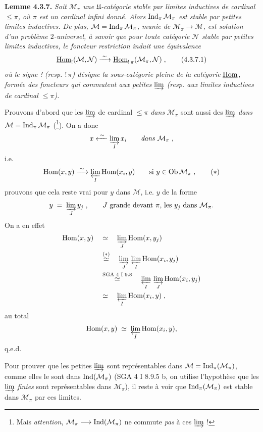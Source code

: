 \textbf{Lemme 4.3.7.} \textit{Soit $\mathcal{M}_\pi$ une $\mathfrak{U}$-catégorie stable par limites inductives de cardinal $\leqslant \pi$, où $\pi$ est un cardinal infini donné. Alors} $\operatorname{Ind}_\pi\mathcal{M}_\pi$ \textit{est stable par petites limites inductives. De plus, $\mathcal{M} = \operatorname{Ind}_\pi\mathcal{M}_\pi$, munie de $\mathcal{M}_\pi \longrightarrow \mathcal{M}$, est solution d'un problème $2$-universel, à savoir
que pour toute catégorie $\mathcal{N}$ stable par petites limites inductives, le foncteur restriction induit une équivalence}
\[
\underline{\mathrm{Hom}}_{!}(\mathcal{M},\mathcal{N}) \xrightarrow{\;\sim\;} \underline{\mathrm{Hom}}_{!\,\pi}(\mathcal{M}_\pi,\mathcal{N}) \;, \tag*{(4.3.7.1)}
\]
\textit{où le signe ! (resp. $!\,\pi$) désigne la sous-catégorie pleine de la catégorie} $\underline{\mathrm{Hom}}$\textit{, formée des foncteurs qui commutent aux petites} $\varinjlim$ \textit{(resp. aux limites inductives de cardinal $\leqslant \pi$).}

Prouvons d'abord que les $\varinjlim$ de cardinal $\leqslant \pi$ \textit{dans} $\mathcal{M}_\pi$ sont aussi des $\varinjlim$ \textit{dans} $\mathcal{M} = \operatorname{Ind}_\pi\mathcal{M}_\pi$ (\footnote{Mais \textit{attention}, $\mathcal{M}_\pi \longrightarrow \operatorname{Ind}(\mathcal{M}_\pi)$ ne commute \textit{pas} à ces $\varinjlim$ !}). On a donc
\[
x \xleftarrow{\;\sim\;} \varinjlim_{I} x_i \qquad \textit{dans } \mathcal{M}_\pi \;,
\]
i.e.
\[
\mathrm{Hom}(x,y) \xrightarrow{\;\sim\;} \varprojlim_{I} \mathrm{Hom}(x_i,y) \qquad \text{si } y \in \mathrm{Ob}\,\mathcal{M}_\pi \;, \tag*{$(*)$}
\]
prouvons que cela reste vrai pour $y$ dans $\mathcal{M}$, i.e. $y$ de la forme
\[
y \;=\; \varinjlim_{J} y_j \;, \qquad J \text{ grande devant } \pi\text{, les } y_j \text{ dans } \mathcal{M}_\pi.
\]
On a en effet
\[
\begin{aligned}
\mathrm{Hom}(x,y) \quad &\simeq \quad \varinjlim_{J} \mathrm{Hom}(x,y_j)\\
&\overset{(*)}{\simeq} \quad \varinjlim_{J}\, \varprojlim_{I} \mathrm{Hom}(x_i,y_j)\\
&\overset{\text{SGA 4 I 9.8}}{\simeq} \quad \varprojlim_{I}\, \varinjlim_{J} \mathrm{Hom}(x_i,y_j)\\
&\simeq \quad \varprojlim_{I} \mathrm{Hom}(x_i,y) \;,
\end{aligned}
\]
au total
\[
\mathrm{Hom}(x,y) \;\simeq\; \varprojlim_{I} \mathrm{Hom}(x_i,y),
\]
q.e.d.

Pour prouver que les petites $\varinjlim$ sont représentables dans $\mathcal{M} = \operatorname{Ind}_\pi(\mathcal{M}_\pi)$, comme elles le sont dans $\operatorname{Ind}(\mathcal{M}_\pi)$ (SGA 4 I 8.9.5 b, on utilise l'hypothèse que les $\varinjlim$ \textit{finies} sont représentables dans $\mathcal{M}_\pi$), il reste à voir que $\operatorname{Ind}_\pi(\mathcal{M}_\pi)$ est stable dans $\mathcal{M}_\pi$ par ces limites.

